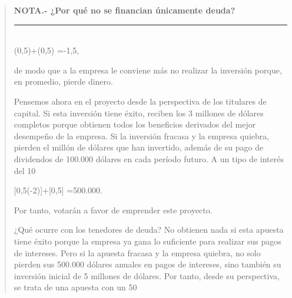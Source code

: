 \documentclass[10pt,a4paper]{article}
\newenvironment{specialblock}[1]{%
      \begin{quote} %
      \small %
      \noindent\textbf{#1}\\[-0.3em] %
      \rule{\linewidth}{0.4pt}\\[0.6em]}{
      \end{quote}}
\begin{document}
\begin{specialblock}{\textbf{NOTA.-} ¿Por qué no se financian únicamente deuda?}
    (0,5)+(0,5)
    =-1,5,
    
    de modo que a la empresa le conviene más no realizar la inversión porque, en promedio, pierde dinero.
    
    Pensemos ahora en el proyecto desde la perspectiva de los titulares de capital. Si esta inversión tiene éxito, reciben los 3 millones de dólares completos porque obtienen todos los beneficios derivados del mejor desempeño de la empresa. Si la inversión fracasa y la empresa quiebra, pierden el millón de dólares que han invertido, además de su pago de dividendos de 100.000 dólares en cada período futuro. A un tipo de interés del 10 %
    
    [0,5\times(-2)]+[0,5]
    =500.000.
    
    Por tanto, votarán a favor de emprender este proyecto.
    
    ¿Qué ocurre con los tenedores de deuda? No obtienen nada si esta apuesta tiene éxito porque la empresa ya gana lo suficiente para realizar sus pagos de intereses. Pero si la apuesta fracasa y la empresa quiebra, no solo pierden sus 500.000 dólares anuales en pagos de intereses, sino también su inversión inicial de 5 millones de dólares. Por tanto, desde su perspectiva, se trata de una apuesta con un 50 %
    

\end{specialblock}
\end{document}
